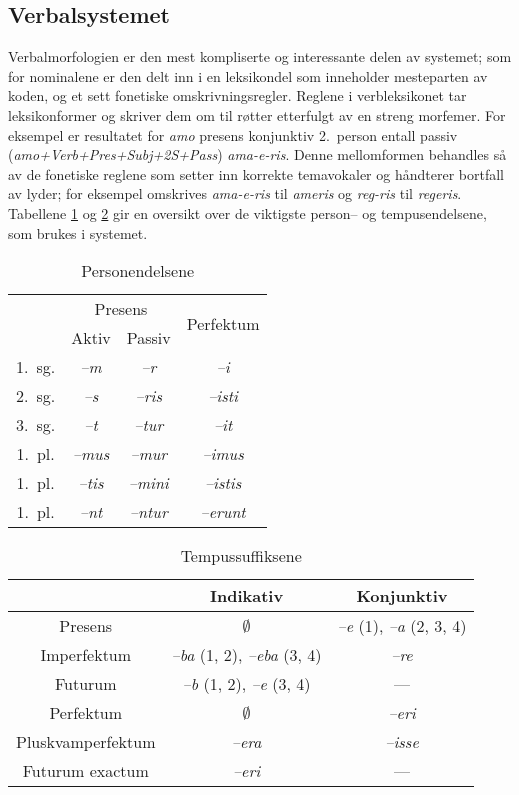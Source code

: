 \documentclass{article}
\let\form\emph
\let\w\emph
\begin{document}
\subsection{Verbalsystemet}
\label{konjugasjon}
Verbalmorfologien er den mest kompliserte og interessante delen av systemet;
som for nominalene er den delt inn i en leksikondel som inneholder mesteparten
av koden, og et sett fonetiske omskrivningsregler. Reglene i verbleksikonet
tar leksikonformer og skriver dem om til r\o{}tter etterfulgt av en streng
morfemer. For eksempel er resultatet for \w{amo} presens konjunktiv 2.~person
entall passiv (\form{amo+Verb+Pres+Subj+2S+Pass}) \w{ama-e-ris}. Denne
mellomformen behandles s\aa{} av de fonetiske reglene som setter inn korrekte
temavokaler og h\aa{}ndterer bortfall av lyder; for eksempel omskrives
\w{ama-e-ris} til \w{ameris} og \w{reg-ris} til \w{regeris}. Tabellene
\ref{endelser} og \ref{tempus} gir en oversikt over de viktigste person-- og
tempusendelsene, som brukes i systemet.

\begin{table}
\begin{center}
\begin{tabular}{|c|c|c|c|}
    \hline
       & \multicolumn{2}{c|}{Presens} & \multirow{2}{*}{Perfektum} \\ \cline{2-3}
       & Aktiv & Passiv & \\
    \hline
1.~sg. & \w{--m}   & \w{--r}    & \w{--i}     \\
2.~sg. & \w{--s}   & \w{--ris}  & \w{--isti}  \\
3.~sg. & \w{--t}   & \w{--tur}  & \w{--it}    \\
1.~pl. & \w{--mus} & \w{--mur}  & \w{--imus}  \\
1.~pl. & \w{--tis} & \w{--mini} & \w{--istis} \\
1.~pl. & \w{--nt}  & \w{--ntur} & \w{--erunt} \\
    \hline
\end{tabular}
\caption{Personendelsene}
\label{endelser}
\end{center}
\end{table}

\begin{table}
\begin{center}
\begin{tabular}{|c|c|c|}
    \hline
                  & Indikativ   & Konjunktiv \\
    \hline
Presens           & $\emptyset$ & \w{--e} (1), \w{--a} (2, 3, 4) \\
Imperfektum       & \w{--ba} (1, 2), \w{--eba} (3, 4) & \w{--re} \\
Futurum           & \w{--b} (1, 2), \w{--e} (3, 4) & --- \\
    \hline
Perfektum         & $\emptyset$ & \w{--eri} \\
Pluskvamperfektum & \w{--era} & \w{--isse} \\
Futurum exactum   & \w{--eri} & ---        \\
    \hline
\end{tabular}
\caption{Tempussuffiksene}
\label{tempus}
\end{center}
\end{table}
\end{document}
